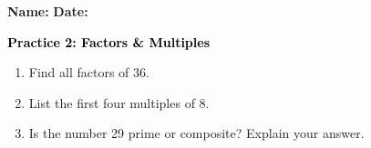 \documentclass[12pt, letterpaper, fleqn]{article}
\begin{document}
\textbf{Name:} \underline{\hspace{5cm}}
\hfill
\textbf{Date:} \underline{\hspace{3cm}}\\

\begin{tcolorbox}[colback=customteal!20]
    \large\textcolor{black}{\textbf{Practice 2: Factors \& Multiples}}
\end{tcolorbox}

\vspace{5mm}
\begin{enumerate}[itemsep=3.5cm, leftmargin=0.6cm]
\item Find all factors of 36.
\vspace{3.5cm}

\item List the first four multiples of 8.
\vspace{3.5cm}

\item Is the number 29 prime or composite? Explain your answer.
\end{enumerate}
\end{document}
